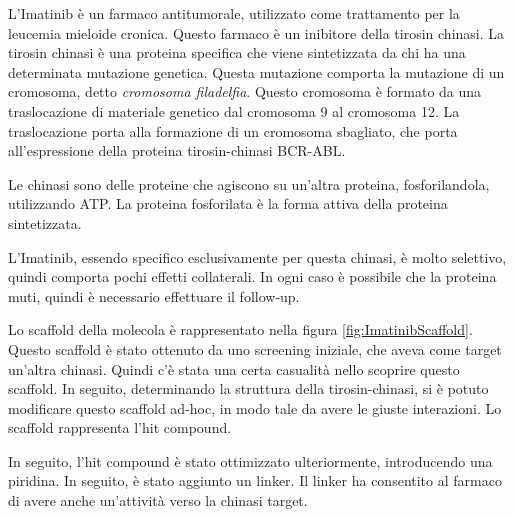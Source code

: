 L'Imatinib è un farmaco antitumorale, utilizzato come trattamento per la
leucemia mieloide cronica. Questo farmaco è un inibitore della tirosin
chinasi. La tirosin chinasi è una proteina specifica che viene
sintetizzata da chi ha una determinata mutazione genetica. Questa
mutazione comporta la mutazione di un cromosoma, detto \emph{cromosoma
filadelfia}. Questo cromosoma è formato da una traslocazione di
materiale genetico dal cromosoma 9 al cromosoma 12. La traslocazione
porta alla formazione di un cromosoma sbagliato, che porta
all'espressione della proteina tirosin-chinasi BCR-ABL.{}


Le chinasi sono delle proteine che agiscono su un'altra proteina,
fosforilandola, utilizzando ATP.{} La proteina fosforilata è la forma
attiva della proteina sintetizzata.




L'Imatinib, essendo specifico esclusivamente per questa chinasi, è molto
selettivo, quindi comporta pochi effetti collaterali. In ogni caso è
possibile che la proteina muti, quindi è necessario effettuare il
follow-up.


Lo scaffold della molecola è rappresentato nella figura
{}\ref{fig:ImatinibScaffold}. Questo scaffold è stato ottenuto da uno
screening iniziale, che aveva come target un'altra chinasi. Quindi c'è
stata una certa casualità nello scoprire questo scaffold. In seguito,
determinando la struttura della tirosin-chinasi, si è potuto modificare
questo scaffold ad-hoc, in modo tale da avere le giuste interazioni. Lo
scaffold rappresenta l'hit compound.

In seguito, l'hit compound è stato ottimizzato ulteriormente,
introducendo una piridina.
In seguito, è stato aggiunto un linker. Il linker ha consentito al
farmaco di avere anche un'attività verso la chinasi target.

